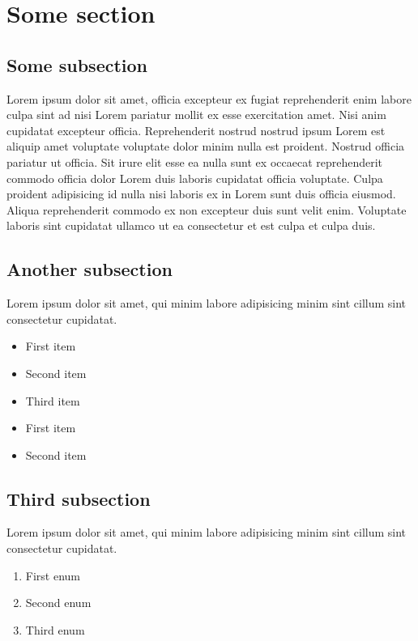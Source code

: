 \documentclass[12pt]{article}
\begin{document}
\tableofcontents\thispagestyle{fancy}
\newpage
\section{Some section}
\subsection{Some subsection}
Lorem ipsum dolor sit amet, officia excepteur ex fugiat reprehenderit enim labore culpa sint ad nisi Lorem pariatur mollit ex esse exercitation amet. Nisi anim cupidatat excepteur officia. Reprehenderit nostrud nostrud ipsum Lorem est aliquip amet voluptate voluptate dolor minim nulla est proident. Nostrud officia pariatur ut officia. Sit irure elit esse ea nulla sunt ex occaecat reprehenderit commodo officia dolor Lorem duis laboris cupidatat officia voluptate. Culpa proident adipisicing id nulla nisi laboris ex in Lorem sunt duis officia eiusmod. Aliqua reprehenderit commodo ex non excepteur duis sunt velit enim. Voluptate laboris sint cupidatat ullamco ut ea consectetur et est culpa et culpa duis.

\subsection{Another subsection}
Lorem ipsum dolor sit amet, qui minim labore adipisicing minim sint cillum sint consectetur cupidatat.
\begin{itemize}
    \item First item
    \item Second item
    \item Third item
\end{itemize}
 
\begin{itemize}
    \item First item
    \item Second item
\end{itemize}
\subsection{Third subsection}
Lorem ipsum dolor sit amet, qui minim labore adipisicing minim sint cillum sint consectetur cupidatat.
\begin{enumerate}
    \item First enum
    \item Second enum
    \item Third enum
\end{enumerate}
\end{document}
